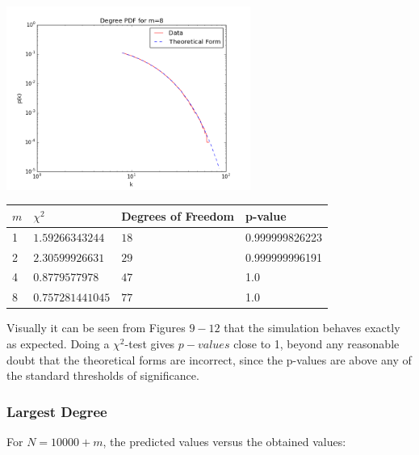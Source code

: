 \documentclass[twoside]{article}
\begin{document}
\begin{multicols}{2}
\begin{center}
\end{center}
\begin{center}
  \includegraphics[height=60mm]{comparison32.png}
\end{center}
\end{multicols}
\begin{center}
    \begin{tabular}{|l|l|l|l|}
    \hline
    $m$ & $\chi^2$ & Degrees of Freedom &p-value \\ \hline
    1 & $1.59266343244 $ & $18$ & 0.999999826223\\ \hline
    2 & $2.30599926631 $ & $29$& 0.999999996191\\ \hline
    4 &  $0.8779577978 $ & $47$&1.0\\ \hline
    8 &  $0.757281441045$ & $77$&1.0\\ \hline
    \end{tabular}
\end{center}
Visually it can be seen from Figures $9-12$ that the simulation behaves exactly as expected. Doing a $\chi^2$-test gives $p-values$ close to 1, beyond any reasonable doubt that the theoretical forms are incorrect, since the p-values are above any of the standard thresholds of significance.

\subsubsection{Largest Degree}
For $N=10000+m$, the predicted values versus the obtained values:
\end{document}

